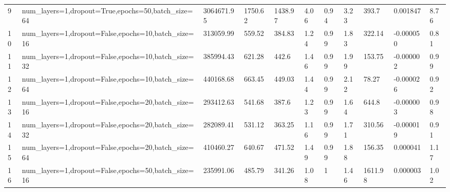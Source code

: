 \begin{longtable}{C{0.8cm} L{2cm} C{1.15cm} C{1.15cm} C{1.15cm} C{1.15cm} C{0.85cm} C{1.25cm} C{1.2cm} C{1.5cm} C{1.0cm}}
9 & num\_layers=1,\newline dropout=True,\newline epochs=50,\newline batch\_size=64 & 3064671.95 & 1750.62 & 1438.97 & 4.06 & 0.94 & 3.23 & 393.7 & 0.001847 & 8.76 \\
10 & num\_layers=1,\newline dropout=False,\newline epochs=10,\newline batch\_size=16 & 313059.99 & 559.52 & 384.83 & 1.24 & 0.99 & 1.83 & 322.14 & -0.000050 & 0.81 \\
11 & num\_layers=1,\newline dropout=False,\newline epochs=10,\newline batch\_size=32 & 385994.43 & 621.28 & 442.6 & 1.46 & 0.99 & 1.99 & 153.75 & -0.000002 & 0.99 \\
12 & num\_layers=1,\newline dropout=False,\newline epochs=10,\newline batch\_size=64 & 440168.68 & 663.45 & 449.03 & 1.44 & 0.99 & 2.12 & 78.27 & -0.000026 & 0.92 \\
13 & num\_layers=1,\newline dropout=False,\newline epochs=20,\newline batch\_size=16 & 293412.63 & 541.68 & 387.6 & 1.23 & 0.99 & 1.64 & 644.8 & -0.000003 & 0.98 \\
14 & num\_layers=1,\newline dropout=False,\newline epochs=20,\newline batch\_size=32 & 282089.41 & 531.12 & 363.25 & 1.16 & 0.99 & 1.71 & 310.56 & -0.000019 & 0.91 \\
15 & num\_layers=1,\newline dropout=False,\newline epochs=20,\newline batch\_size=64 & 410460.27 & 640.67 & 471.52 & 1.49 & 0.99 & 1.88 & 156.35 & 0.000041 & 1.17 \\
16 & num\_layers=1,\newline dropout=False,\newline epochs=50,\newline batch\_size=16 & 235991.06 & 485.79 & 341.26 & 1.08 & 1 & 1.46 & 1611.98 & 0.000003 & 1.02 \\

\end{longtable}
